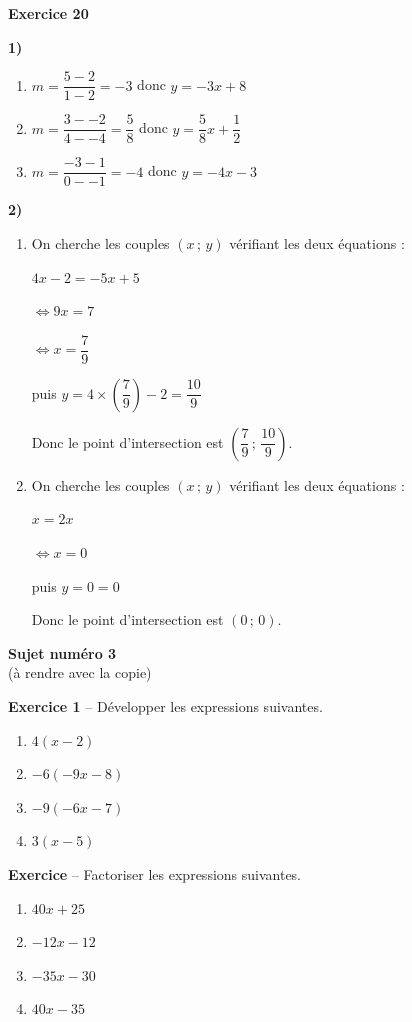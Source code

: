 \documentclass[12pt,a4paper,french]{article}
\begin{document}
\noindent\textbf{Exercice 20}\par
\smallskip
\textbf{1)}
\begin{enumerate}
\item $m = \dfrac{5-2}{1-2} = -3$ donc $y = -3x + 8$
\item $m = \dfrac{3--2}{4--4} = \dfrac{5}{8}$ donc $y = \dfrac{5}{8}x + \dfrac{1}{2}$
\item $m = \dfrac{-3-1}{0--1} = -4$ donc $y = -4x - 3$
\end{enumerate}
\textbf{2)}
\begin{enumerate}
\item On cherche les couples $(x\,;\,y)$ vérifiant les deux équations :

$4x - 2 = -5x + 5$

$\Leftrightarrow 9x = 7$

$\Leftrightarrow x = \dfrac{7}{9}$

puis $y = 4 \times (\dfrac{7}{9}) - 2 = \dfrac{10}{9}$

Donc le point d'intersection est $\left(\dfrac{7}{9}\,;\,\dfrac{10}{9}\right)$.
\item On cherche les couples $(x\,;\,y)$ vérifiant les deux équations :

$x = 2x$

$\Leftrightarrow x = 0$

puis $y = 0 = 0$

Donc le point d'intersection est $\left(0\,;\,0\right)$.
\end{enumerate}
\medskip

\newpage
\begin{center}
\textbf{Sujet numéro 3}
\\(à rendre avec la copie)
\end{center}


\noindent\textbf{Exercice 1} -- Développer les expressions suivantes.
\begin{enumerate}
\item $4(x - 2)$
\item $-6(-9x - 8)$
\item $-9(-6x - 7)$
\item $3(x - 5)$
\end{enumerate}
\noindent\textbf{Exercice} -- Factoriser les expressions suivantes.
\begin{enumerate}
\item $40x + 25$
\item $-12x - 12$
\item $-35x - 30$
\item $40x - 35$
\end{enumerate}
\bigskip
\end{document}

